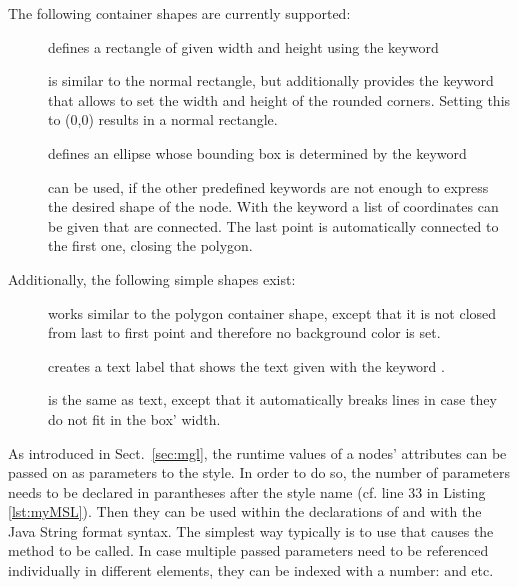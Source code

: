 \documentclass[a4paper,american,12pt]{scrreprt}
\begin{document}
The following container shapes are currently supported:
\begin{description}
\item[] defines a rectangle of given width and height using the
 keyword
\item[] is similar to the normal rectangle, but
additionally provides the  keyword that allows to set the width and
height of the rounded corners. Setting this to (0,0) results in a normal
rectangle.
\item[] defines an ellipse whose bounding box is determined by the
 keyword
\item[] can be used, if the other predefined keywords are not enough to
express the desired shape of the node. With the  keyword a list of
coordinates can be given that are connected. The last point is
automatically connected to the first one, closing the polygon.
\end{description}
%


Additionally, the following simple shapes exist:

\begin{description}
\item[] works similar to the polygon container shape, except that
it is not closed from last to first point and therefore no background color is
set.
\item[] creates a text label that shows the text given with the keyword
.
\item[] is the same as text, except that it 
automatically breaks lines in case they do not fit in the box' width.
\end{description}

As introduced in Sect.~\ref{sec:mgl}, the runtime values of a nodes' attributes
can be passed on as parameters to the style. In order to do so, the number of parameters
needs to be declared in parantheses after the style name (cf. line 33 in
Listing \ref{lst:myMSL}). Then they can be used within the  declarations
of  and  with the Java String format
syntax\footnotemark{}. The simplest way typically is to use  that
causes the  method to be called. In case multiple passed
parameters need to be referenced individually in different  elements,
they can be indexed with a number:  and  etc.
%
%
\end{document}
